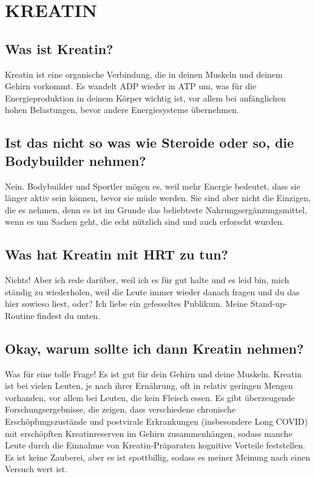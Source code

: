 \documentclass{article}
\begin{document}
{{{				  

																																																																																																																																																																																																																																																														

\section{KREATIN}

\subsection{Was ist Kreatin?}

Kreatin ist eine organische Verbindung, die in deinen Muskeln und deinem Gehirn vorkommt. Es wandelt ADP wieder in ATP um, was für die Energieproduktion in deinem Körper wichtig ist, vor allem bei anfänglichen hohen Belastungen, bevor andere Energiesysteme übernehmen.

\subsection{Ist das nicht so was wie Steroide oder so, die Bodybuilder nehmen?}

Nein. Bodybuilder und Sportler mögen es, weil mehr Energie bedeutet, dass sie länger aktiv sein können, bevor sie müde werden. Sie sind aber nicht die Einzigen, die es nehmen, denn es ist im Grunde das beliebteste Nahrungsergänzungsmittel, wenn es um Sachen geht, die echt nützlich sind und auch erforscht wurden.

\subsection{Was hat Kreatin mit HRT zu tun?}

Nichts! Aber ich rede darüber, weil ich es für gut halte und es leid bin, mich ständig zu wiederholen, weil die Leute immer wieder danach fragen und du das hier sowieso liest, oder? Ich liebe ein gefesseltes Publikum. Meine Stand-up-Routine findest du unten.

\subsection{Okay, warum sollte ich dann Kreatin nehmen?}

Was für eine tolle Frage! Es ist gut für dein Gehirn und deine Muskeln. Kreatin ist bei vielen Leuten, je nach ihrer Ernährung, oft in relativ geringen Mengen vorhanden, vor allem bei Leuten, die kein Fleisch essen. Es gibt überzeugende Forschungsergebnisse, die zeigen, dass verschiedene chronische Erschöpfungszustände und postvirale Erkrankungen (insbesondere Long COVID) mit erschöpften Kreatinreserven im Gehirn zusammenhängen, sodass manche Leute durch die Einnahme von Kreatin-Präparaten kognitive Vorteile feststellen. Es ist keine Zauberei, aber es ist spottbillig, sodass es meiner Meinung nach einen Versuch wert ist.

}}}
\end{document}
